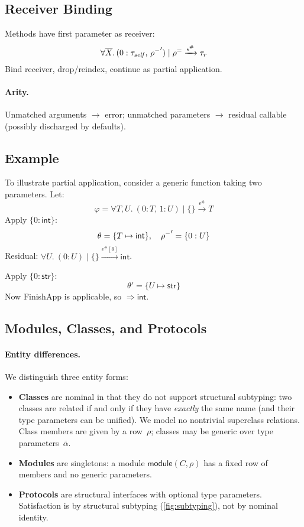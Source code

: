 \subsection{Receiver Binding}
\label{sec:receiver-binding}
Methods have first parameter as receiver:
\[
\forall \overline{X}.\,(0:\tau_{\mathit{self}},\,\mathord{\rho^{-}}') \mid \mathord{\rho^{=}} \xrightarrow{\epsilon^\#} \tau_r
\]
Bind receiver, drop/reindex, continue as partial application.

\paragraph{Arity.}
Unmatched arguments $\to$ error; unmatched parameters $\to$ residual callable (possibly discharged by defaults).

\subsection{Example}
To illustrate partial application, consider a generic function taking two parameters. Let:
\[
\varphi = \forall T,U.~(0:T,\,1:U) \mid \{\} \xrightarrow{\epsilon^\#} T
\]
Apply $\{0:\mathsf{int}\}$:
\[
\theta=\{T\mapsto \mathsf{int}\},\quad \mathord{\rho^{-}}'=\{0:U\}
\]
Residual: $\forall U.~(0:U) \mid \{\} \xrightarrow{\epsilon^\#[\theta]} \mathsf{int}$.

Apply $\{0:\mathsf{str}\}$:
\[
\theta'=\{U\mapsto \mathsf{str}\}
\]
Now \textsf{FinishApp} is applicable, so $\Rightarrow \mathsf{int}$.

\subsection{Modules, Classes, and Protocols}
\label{sec:modules-classes-protocols}

\paragraph{Entity differences.}
We distinguish three entity forms:
\begin{itemize}
    \item \textbf{Classes} are nominal in that they do not support structural subtyping: two classes are related if and only if they have \emph{exactly} the same name (and their type parameters can be unified). We model no nontrivial superclass relations. Class members are given by a row~$\rho$; classes may be generic over type parameters~$\overline{\alpha}$.
    \item \textbf{Modules} are singletons: a module $\mathsf{module}(C, \rho)$ has a fixed row of members and no generic parameters.
    \item \textbf{Protocols} are structural interfaces with optional type parameters. Satisfaction is by structural subtyping (\cref{fig:subtyping}), not by nominal identity.
\end{itemize}

